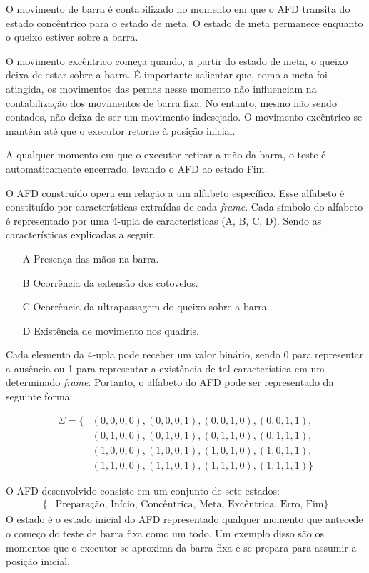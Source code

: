 O movimento de barra é contabilizado no momento em que o \ac{AFD} transita do estado concêntrico para o estado de meta. O estado de meta permanece enquanto o queixo estiver sobre a barra.

O movimento excêntrico começa quando, a partir do estado de meta, o queixo deixa de estar sobre a barra. É importante salientar que, como a meta foi atingida, os movimentos das pernas nesse momento não influenciam na contabilização dos movimentos de barra fixa. No entanto, mesmo não sendo contados, não deixa de ser um movimento indesejado. O movimento excêntrico se mantém até que o executor retorne à posição inicial.

A qualquer momento em que o executor retirar a mão da barra, o teste é automaticamente encerrado, levando o \ac{AFD} ao estado Fim.

O \ac{AFD} construído opera em relação a um alfabeto específico. Esse alfabeto é constituído por características extraídas de cada \textit{frame}. Cada símbolo do alfabeto é representado por uma 4-upla de características (A, B, C, D). Sendo as características explicadas a seguir.

\begin{itemize}
    \item[A] Presença das mãos na barra.
    \item[B] Ocorrência da extensão dos cotovelos.
    \item[C] Ocorrência da ultrapassagem do queixo sobre a barra.
    \item[D] Existência de movimento nos quadris.
\end{itemize} 

Cada elemento da 4-upla pode receber um valor binário, sendo 0 para representar a ausência ou 1 para representar a existência de tal característica em um determinado \textit{frame}. Portanto, o alfabeto do \ac{AFD} pode ser representado da seguinte forma:

\[
\begin{aligned}
\Sigma = \{ &(0, 0, 0, 0), (0, 0, 0, 1), (0, 0, 1, 0), (0, 0, 1, 1), \\
            &(0, 1, 0, 0), (0, 1, 0, 1), (0, 1, 1, 0), (0, 1, 1, 1), \\
            &(1, 0, 0, 0), (1, 0, 0, 1), (1, 0, 1, 0), (1, 0, 1, 1), \\
            &(1, 1, 0, 0), (1, 1, 0, 1), (1, 1, 1, 0), (1, 1, 1, 1) \}
\end{aligned}
\]

O \ac{AFD} desenvolvido consiste em um conjunto de sete estados:
\[
\begin{aligned}
\{ &\text{Preparação, Início, Concêntrica, Meta, Excêntrica, Erro, Fim} \}
\end{aligned}
\]
O estado  é o estado inicial do \ac{AFD} representado qualquer momento que antecede o começo do teste de barra fixa como um todo. Um exemplo disso são os momentos que o executor se aproxima da barra fixa e se prepara para assumir a posição inicial.

